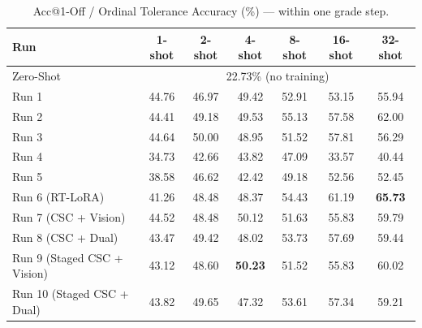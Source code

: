 \documentclass[letterpaper,11pt,leqno]{article}
\begin{document}
\begin{table}[H]
\centering
\caption{Acc@1-Off / Ordinal Tolerance Accuracy (\%) --- within one grade step.}
\small
\begin{tabular}{lcccccc}
\toprule
\textbf{Run} & \textbf{1-shot} & \textbf{2-shot} & \textbf{4-shot}
             & \textbf{8-shot} & \textbf{16-shot} & \textbf{32-shot} \\
\midrule
Zero-Shot & \multicolumn{6}{c}{22.73\% (no training)} \\
\midrule
Run 1 & \cellcolor{bestgreen}44.76 & 46.97 & 49.42 & 52.91 & 53.15 & 55.94 \\
Run 2 & 44.41 & 49.18 & 49.53 & \cellcolor{bestgreen}55.13 & 57.58 & 62.00 \\
Run 3 & 44.64 & \cellcolor{bestgreen}50.00 & 48.95 & 51.52 & 57.81 & 56.29 \\
Run 4 & \cellcolor{worstred}34.73 & \cellcolor{worstred}42.66 & \cellcolor{worstred}43.82 & \cellcolor{worstred}47.09 & \cellcolor{worstred}33.57 & \cellcolor{worstred}40.44 \\
Run 5 & 38.58 & 46.62 & 42.42 & 49.18 & 52.56 & 52.45 \\
Run 6 (RT-LoRA) & 41.26 & 48.48 & 48.37 & 54.43 & \cellcolor{bestgreen}61.19 & \cellcolor{bestgreen}\textbf{65.73} \\
Run 7 (CSC + Vision) & 44.52 & 48.48 & 50.12 & 51.63 & 55.83 & 59.79 \\
Run 8 (CSC + Dual)   & 43.47 & 49.42 & 48.02 & 53.73 & 57.69 & 59.44 \\
Run 9 (Staged CSC + Vision) & 43.12 & 48.60 & \cellcolor{bestgreen}\textbf{50.23} & 51.52 & 55.83 & 60.02 \\
Run 10 (Staged CSC + Dual)  & 43.82 & 49.65 & 47.32 & 53.61 & 57.34 & 59.21 \\
\bottomrule
\end{tabular}
\end{table}
\end{document}
